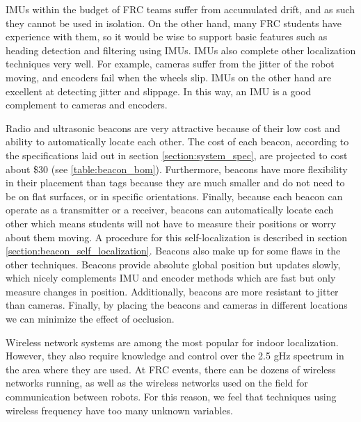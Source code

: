 \documentclass{article}
\begin{document}
  IMUs within the budget of FRC teams suffer from accumulated drift, and as such they cannot be used in isolation. On the other hand, many FRC students have experience with them, so it would be wise to support basic features such as heading detection and filtering using IMUs. IMUs also complete other localization techniques very well. For example, cameras suffer from the jitter of the robot moving, and encoders fail when the wheels slip. IMUs on the other hand are excellent at detecting jitter and slippage. In this way, an IMU is a good complement to cameras and encoders.

  Radio and ultrasonic beacons are very attractive because of their low cost and ability to automatically locate each other. The cost of each beacon, according to the specifications laid out in section \ref{section:system_spec}, are projected to cost about \$30 (see \ref{table:beacon_bom}). Furthermore, beacons have more flexibility in their placement than tags because they are much smaller and do not need to be on flat surfaces, or in specific orientations. Finally, because each beacon can operate as a transmitter or a receiver, beacons can automatically locate each other which means students will not have to measure their positions or worry about them moving. A procedure for this self-localization is described in section \ref{section:beacon_self_localization}. Beacons also make up for some flaws in the other techniques. Beacons provide absolute global position but updates slowly, which nicely complements IMU and encoder methods which are fast but only measure changes in position. Additionally, beacons are more resistant to jitter than cameras. Finally, by placing the beacons and cameras in different locations we can minimize the effect of occlusion.

  Wireless network systems are among the most popular for indoor localization. However, they also require knowledge and control over the 2.5 gHz spectrum in the area where they are used. At FRC events, there can be dozens of wireless networks running, as well as the wireless networks used on the field for communication between robots. For this reason, we feel that techniques using wireless frequency have too many unknown variables.
\end{document}
